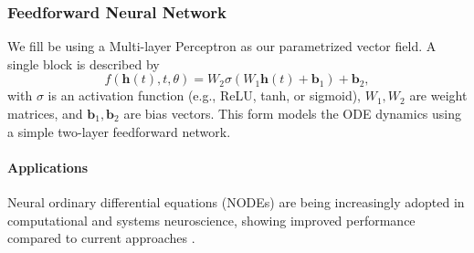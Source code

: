 \documentclass{article}
\theoremstyle{definition} \newtheorem{definition}{Definition}  \newtheorem{example}{Example}
\theoremstyle{remark} \newtheorem{remark}{Remark}
\newcounter{ct}
\begin{document}
\subsubsection{Feedforward Neural Network}\label{sec:fnn}
We fill be using a Multi-layer Perceptron as our parametrized vector field. 
A single block is described by
\[
f(\mathbf{h}(t), t, \theta) = W_2 \sigma(W_1 \mathbf{h}(t) + \mathbf{b}_1) + \mathbf{b}_2,
\]
with \( \sigma \) is an activation function (e.g., ReLU, tanh, or sigmoid), \( W_1, W_2 \) are weight matrices, and \( \mathbf{b}_1, \mathbf{b}_2 \) are bias vectors.
This form models the ODE dynamics using a simple two-layer feedforward network.





\paragraph{Applications}
Neural ordinary differential equations (NODEs) are being increasingly adopted in computational and systems neuroscience, showing improved performance compared to current approaches \citep{kim2021inferring,geenjaar2023learning,sedler2023expressive,elgazzar2024universal,rubanova2019latent,coelho2024enhancing}.







\end{document}
